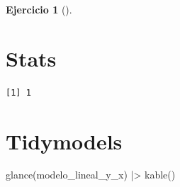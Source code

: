 \documentclass[
  a4paper,
]{scrreport}
\newenvironment{Shaded}{\begin{snugshade}}{\end{snugshade}}
\newcommand{\FunctionTok}[1]{\textcolor[rgb]{0.28,0.35,0.67}{#1}}
\newcommand{\NormalTok}[1]{\textcolor[rgb]{0.00,0.23,0.31}{#1}}
\newcommand{\SpecialCharTok}[1]{\textcolor[rgb]{0.37,0.37,0.37}{#1}}
\theoremstyle{definition}
\newtheorem{exercise}{Ejercicio}[chapter]
\theoremstyle{remark}
\begin{document}
\begin{exercise}[]
\begin{enumerate}
\begin{tcolorbox}
  \section{Stats}

\begin{Shaded}
\end{Shaded}

\begin{verbatim}
[1] 1
\end{verbatim}

  \section{Tidymodels}

\begin{Shaded}
\begin{Highlighting}[]
\FunctionTok{glance}\NormalTok{(modelo\_lineal\_y\_x) }\SpecialCharTok{|\textgreater{}} \FunctionTok{kable}\NormalTok{()}
\end{Highlighting}
\end{Shaded}


\end{tcolorbox}
\end{enumerate}
\end{exercise}
\end{document}
